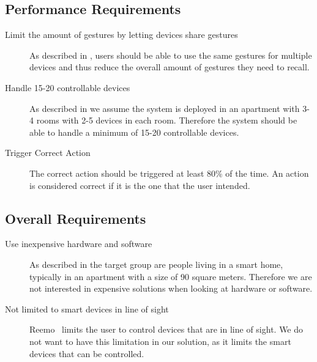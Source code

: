 \subsection{Performance Requirements}

\begin{description}
\item[Limit the amount of gestures by letting devices share gestures] As described in , users should be able to use the same gestures for multiple devices and thus reduce the overall amount of gestures they need to recall.
\item[Handle 15-20 controllable devices] As described in  we assume the system is deployed in an apartment with 3-4 rooms with 2-5 devices in each room. Therefore the system should be able to handle a minimum of 15-20 controllable devices.
\item[Trigger Correct Action] The correct action should be triggered at least 80\% of the time. An action is considered correct if it is the one that the user intended.
\end{description}

\subsection{Overall Requirements}

\begin{description}
\item[Use inexpensive hardware and software] As described in  the target group are people living in a smart home, typically in an apartment with a size of 90 square meters. Therefore we are not interested in expensive solutions when looking at hardware or software.
\item[Not limited to smart devices in line of sight] Reemo~\cite{reemo:about} limits the user to control devices that are in line of sight. We do not want to have this limitation in our solution, as it limits the smart devices that can be controlled.
\end{description}

